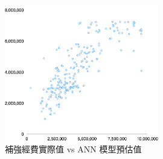 \begin{figure}[hbtp]
  \begin{center}
    \includegraphics[width=0.6\textwidth]{figures/cob-ann-vs.png}
    \caption{補強經費實際值 vs ANN 模型預估值} 
    \label{fig:cob-ann-vs}
  \end{center}
\end{figure}









